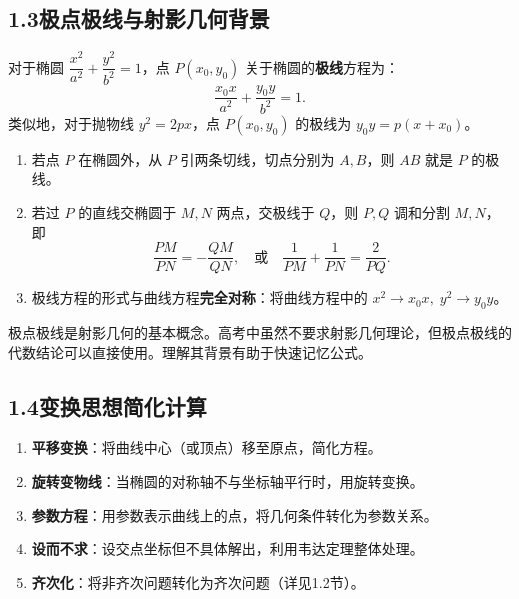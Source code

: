 \documentclass[12pt, a4paper]{ctexart}
\begin{document}
\subsection*{1.3\quad 极点极线与射影几何背景}

\begin{knowledgebox}[极点极线的定义]
对于椭圆 $\dfrac{x^2}{a^2}+\dfrac{y^2}{b^2}=1$，点 $P(x_0,y_0)$ 关于椭圆的\textbf{极线}方程为：
\[
  \frac{x_0 x}{a^2}+\frac{y_0 y}{b^2}=1.
\]
类似地，对于抛物线 $y^2=2px$，点 $P(x_0,y_0)$ 的极线为 $y_0 y=p(x+x_0)$。
\end{knowledgebox}

\begin{knowledgebox}[极点极线的核心性质]
\begin{enumerate}[leftmargin=1.5em]
  \item 若点 $P$ 在椭圆外，从 $P$ 引两条切线，切点分别为 $A,B$，则 $AB$ 就是 $P$ 的极线。
  \item 若过 $P$ 的直线交椭圆于 $M,N$ 两点，交极线于 $Q$，则 $P,Q$ 调和分割 $M,N$，即
  \[
    \frac{PM}{PN}=-\frac{QM}{QN},\quad\text{或}\quad\frac{1}{PM}+\frac{1}{PN}=\frac{2}{PQ}.
  \]
  \item 极线方程的形式与曲线方程\textbf{完全对称}：将曲线方程中的 $x^2\to x_0 x,\;y^2\to y_0 y$。
\end{enumerate}
\end{knowledgebox}

\begin{warnbox}[射影几何视角]
极点极线是射影几何的基本概念。高考中虽然不要求射影几何理论，但极点极线的代数结论可以直接使用。理解其背景有助于快速记忆公式。
\end{warnbox}

\subsection*{1.4\quad 变换思想简化计算}

\begin{knowledgebox}[常用变换策略]
\begin{enumerate}[leftmargin=1.5em]
  \item \textbf{平移变换}：将曲线中心（或顶点）移至原点，简化方程。
  \item \textbf{旋转变物线}：当椭圆的对称轴不与坐标轴平行时，用旋转变换。
  \item \textbf{参数方程}：用参数表示曲线上的点，将几何条件转化为参数关系。
  \item \textbf{设而不求}：设交点坐标但不具体解出，利用韦达定理整体处理。
  \item \textbf{齐次化}：将非齐次问题转化为齐次问题（详见1.2节）。
\end{enumerate}
\end{knowledgebox}
\end{document}
